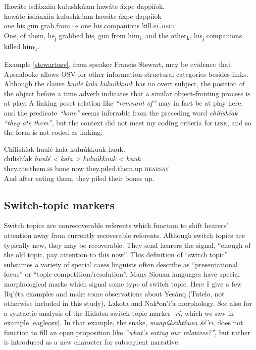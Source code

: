 \documentclass[output=paper]{LSP/langsci}
\begin{document}
\ea\label{apsaalookeosv}
	Hawáte isdáxxiia kulushkúam hawáte áxpe dappiíok.\\
\gll	hawáte 	isdáxxiia 	kulushkúam			hawáte 	áxpe 			dappiíok\\
	one 		his.gun 	grab.from.\textsc{ds} 	one 		his.companions	kill.\textsc{pl.decl}\\
\glt	One\textsubscript{i} of them, he\textsubscript{j} grabbed his\textsubscript{i} gun from him\textsubscript{i}, and the other\textsubscript{k}, his\textsubscript{j} companions killed him\textsubscript{k}.
\z

Example \ref{stewartosv}, from speaker Francis Stewart, may be evidence that Apsaalooke allows OSV for other information-structural categories besides links. Although the clause \emph{huulé kala kuluúkkuuk} has no overt subject, the position of the object before a time adverb indicates that a similar object-fronting process is at play. A linking poset relation like \emph{“remnant of”} may in fact be at play here, and the predicate \emph{“bone”} seems inferrable from the preceding word \emph{chilishíak “they ate them”}, but the context did not meet my coding criteria for \textsc{link}, and so the form is not coded as linking:

\ea\label{stewartosv}
Chilishíak huulé kala kuluúkkuuk huuk.\footnotemark\\
\gll	chilishíak 				\emph{huulé <}	\emph{kala >}	\emph{kuluúkkuuk <}	\emph{huuk}\\
	they.ate.them.\textsc{ss} 	bone 			now 			they.piled.them.up 		\textsc{hearsay}\\
\glt	And after eating them, they piled their bones up.
\z

\subsection{Switch-topic markers}\label{switchtopic}

	Switch topics are nonrecoverable referents which function to shift hearers’ attention away from currently recoverable referents. Although switch topics are typically new, they may be recoverable. They send hearers the signal, “enough of the old topic, pay attention to this now”. This definition of “switch topic” subsumes a variety of special cases linguists often describe as “presentational focus” or “topic competition/resolution”. Many Siouan languages have special morphological marks which signal some type of switch topic. Here I give a few Rų’éta examples and make some observations about Yesánq (Tutelo, not otherwise included in this study), Lakota and Nakʰon’i’a morphology. See also \citet[288--293]{Boyle2007} for a syntactic analysis of the Hidatsa switch-topic marker \emph{-ri}, which we saw in example \ref{eagleosv}. In that example, the snake, \emph{maapúkšihtíawa šé’ri}, does not function to fill an open proposition like \emph{“what’s eating our relatives?”}, but rather is introduced as a new character for subsequent narrative.
	
\end{document}
